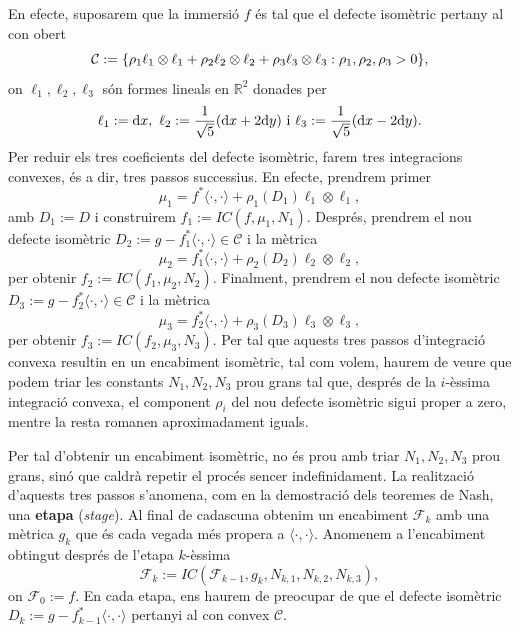 En efecte, suposarem que la immersió $f$ és tal que el defecte isomètric pertany al con obert
\begin{equation*}
    \mathcal C:=\{\rho_1\ell_1\otimes\ell_1 + \rho_2\ell_2\otimes\ell_2 + \rho_3\ell_3\otimes\ell_3 : \rho_1, \rho_2, \rho_3 > 0\},
\end{equation*}
on $\ell_1, \ell_2, \ell_3$ són formes lineals en $\mathbb R^2$ donades per 
\begin{equation*}
    \ell_1:=\text dx, \text{ } \ell_2:=\frac{1}{\sqrt5}(\text dx + 2\text dy) \text{ i } \ell_3:=\frac{1}{\sqrt5}(\text dx - 2\text dy).
\end{equation*}
Per reduir els tres coeficients del defecte isomètric, farem tres integracions convexes, és a dir, tres passos successius. En efecte, prendrem primer
\begin{equation*}
    \mu_1 = f^*\langle\cdot, \cdot\rangle + \rho_1(D_1)\ell_1\otimes\ell_1,
\end{equation*}
amb $D_1:=D$ i construirem $f_1:=IC(f, \mu_1, N_1)$. Després, prendrem el nou defecte isomètric $D_2 := g-f_1^*\langle\cdot, \cdot\rangle\in\mathcal C$ i la mètrica
\begin{equation*}
    \mu_2 = f_1^*\langle\cdot, \cdot\rangle + \rho_2(D_2)\ell_2\otimes\ell_2,
\end{equation*}
 per obtenir $f_2:=IC(f_1, \mu_2, N_2)$. Finalment, prendrem el nou defecte isomètric $D_3 := g-f_2^*\langle\cdot, \cdot\rangle\in\mathcal C$ i la mètrica
\begin{equation*}
    \mu_3 = f_2^*\langle\cdot, \cdot\rangle + \rho_3(D_3)\ell_3\otimes\ell_3,
\end{equation*}
per obtenir $f_3:=IC(f_2, \mu_3, N_3)$. Per tal que aquests tres passos d'integració convexa resultin en un encabiment isomètric, tal com volem, haurem de veure que podem triar les constants $N_1, N_2, N_3$ prou grans tal que, després de la $i$-èssima integració convexa, el component $\rho_i$ del nou defecte isomètric sigui proper a zero, mentre la resta romanen aproximadament iguals. 

Per tal d'obtenir un encabiment isomètric, no és prou amb triar $N_1, N_2, N_3$ prou grans, sinó que caldrà repetir el procés sencer indefinidament. La realització d'aquests tres passos s'anomena, com en la demostració dels teoremes de Nash, una \textbf{etapa} (\textit{stage}). Al final de cadascuna obtenim un encabiment $\mathcal F_k$ amb una mètrica $g_k$ que és cada vegada més propera a $\langle\cdot, \cdot\rangle$. Anomenem a l'encabiment obtingut després de l'etapa $k$-èssima 
\begin{equation*}
    \mathcal F_k:=IC(\mathcal F_{k-1}, g_k, N_{k,1}, N_{k,2}, N_{k,3}),
\end{equation*}
on $\mathcal F_0:=f$. En cada etapa, ens haurem de preocupar de que el defecte isomètric $D_k:=g-f_{k-1}^*\langle\cdot, \cdot\rangle$ pertanyi al con convex $\mathcal C$.

